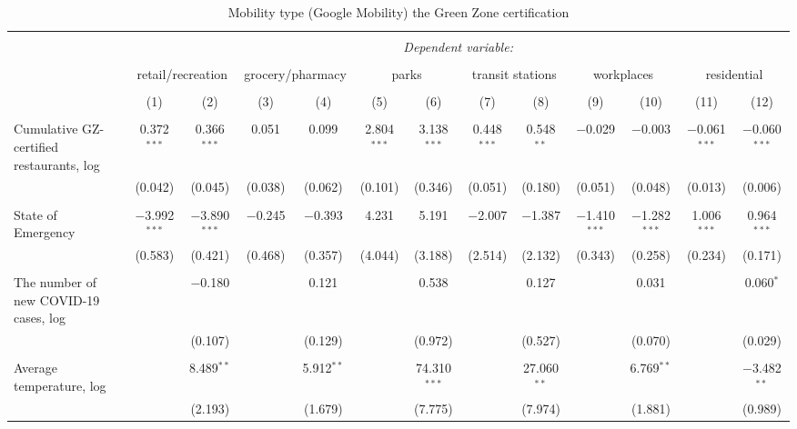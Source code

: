 
\begin{table}[!htbp] \centering 
  \caption{Mobility type (Google Mobility) the Green Zone certification} 
  \label{} 
\footnotesize 
\begin{tabular}{@{\extracolsep{-12pt}}lcccccccccccc} 
\\[-1.8ex]\hline 
\hline \\[-1.8ex] 
 & \multicolumn{12}{c}{\textit{Dependent variable:}} \\ 
\cline{2-13} 
\\[-1.8ex] & \multicolumn{2}{c}{retail/recreation} & \multicolumn{2}{c}{grocery/pharmacy} & \multicolumn{2}{c}{parks} & \multicolumn{2}{c}{transit stations} & \multicolumn{2}{c}{workplaces} & \multicolumn{2}{c}{residential} \\ 
\\[-1.8ex] & (1) & (2) & (3) & (4) & (5) & (6) & (7) & (8) & (9) & (10) & (11) & (12)\\ 
\hline \\[-1.8ex] 
 Cumulative GZ-certified restaurants, log & 0.372$^{***}$ & 0.366$^{***}$ & 0.051 & 0.099 & 2.804$^{***}$ & 3.138$^{***}$ & 0.448$^{***}$ & 0.548$^{**}$ & $-$0.029 & $-$0.003 & $-$0.061$^{***}$ & $-$0.060$^{***}$ \\ 
  & (0.042) & (0.045) & (0.038) & (0.062) & (0.101) & (0.346) & (0.051) & (0.180) & (0.051) & (0.048) & (0.013) & (0.006) \\ 
  & & & & & & & & & & & & \\ 
 State of Emergency & $-$3.992$^{***}$ & $-$3.890$^{***}$ & $-$0.245 & $-$0.393 & 4.231 & 5.191 & $-$2.007 & $-$1.387 & $-$1.410$^{***}$ & $-$1.282$^{***}$ & 1.006$^{***}$ & 0.964$^{***}$ \\ 
  & (0.583) & (0.421) & (0.468) & (0.357) & (4.044) & (3.188) & (2.514) & (2.132) & (0.343) & (0.258) & (0.234) & (0.171) \\ 
  & & & & & & & & & & & & \\ 
 The number of new COVID-19 cases, log &  & $-$0.180 &  & 0.121 &  & 0.538 &  & 0.127 &  & 0.031 &  & 0.060$^{*}$ \\ 
  &  & (0.107) &  & (0.129) &  & (0.972) &  & (0.527) &  & (0.070) &  & (0.029) \\ 
  & & & & & & & & & & & & \\ 
 Average temperature, log &  & 8.489$^{**}$ &  & 5.912$^{**}$ &  & 74.310$^{***}$ &  & 27.060$^{**}$ &  & 6.769$^{**}$ &  & $-$3.482$^{**}$ \\ 
  &  & (2.193) &  & (1.679) &  & (7.775) &  & (7.974) &  & (1.881) &  & (0.989) \\ 

\end{tabular}
\end{table}
